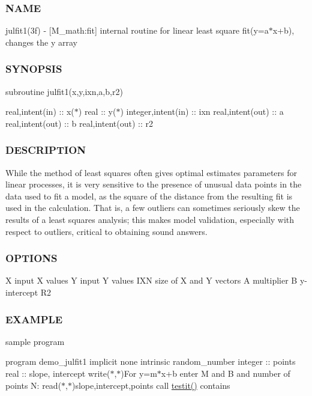 \subsubsection*{N\+A\+ME}

julfit1(3f) -\/ \mbox{[}M\+\_\+math\+:fit\mbox{]} internal routine for linear least square fit(y=a$\ast$x+b), changes the y array \subsubsection*{S\+Y\+N\+O\+P\+S\+IS}

subroutine julfit1(x,y,ixn,a,b,r2)

real,intent(in) \+:\+: x($\ast$) real \+:\+: y($\ast$) integer,intent(in) \+:\+: ixn real,intent(out) \+:\+: a real,intent(out) \+:\+: b real,intent(out) \+:\+: r2 \subsubsection*{D\+E\+S\+C\+R\+I\+P\+T\+I\+ON}

\begin{DoxyVerb}While the method of least squares often gives optimal estimates parameters for linear processes,
it is very sensitive to the presence of unusual data points in the data used to fit a model, as the square of the
distance from the resulting fit is used in the calculation.
That is, a few outliers can sometimes seriously skew the results of a least squares analysis;
this makes model validation, especially with respect to outliers, critical to obtaining sound answers.
\end{DoxyVerb}


\subsubsection*{O\+P\+T\+I\+O\+NS}

X input X values Y input Y values I\+XN size of X and Y vectors A multiplier B y-\/intercept R2 \subsubsection*{E\+X\+A\+M\+P\+LE}

sample program

program demo\+\_\+julfit1 implicit none intrinsic random\+\_\+number integer \+:\+: points real \+:\+: slope, intercept write($\ast$,$\ast$)\textquotesingle{}For y=m$\ast$x+b enter M and B and number of points N\+:\textquotesingle{} read($\ast$,$\ast$)slope,intercept,points call \hyperlink{__uname_8f90_a483d2219923eccf493a883fceee5a424}{testit()} contains

